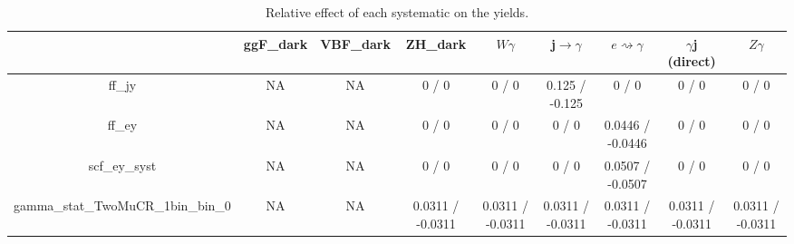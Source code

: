 \documentclass[10pt]{article}
\begin{document}
\begin{table}[htbp]
\begin{center}
\begin{tabular}{|c|c|c|c|c|c|c|c|c|}
\hline 
      & ggF_{dark}      & VBF_{dark}      & ZH_{dark}      & $W\gamma$      & j$\rightarrow\gamma$      & $e\rightsquigarrow\gamma$      & $\gamma$j (direct)      & $Z\gamma$ \\ 
\hline 
  ff_jy &    NA    &    NA    & 0 / 0 & 0 / 0 & 0.125 / -0.125 & 0 / 0 & 0 / 0 & 0 / 0 \\ 
  ff_ey &    NA    &    NA    & 0 / 0 & 0 / 0 & 0 / 0 & 0.0446 / -0.0446 & 0 / 0 & 0 / 0 \\ 
  scf_ey_syst &    NA    &    NA    & 0 / 0 & 0 / 0 & 0 / 0 & 0.0507 / -0.0507 & 0 / 0 & 0 / 0 \\ 
  gamma_stat_TwoMuCR_1bin_bin_0 &    NA    &    NA    & 0.0311 / -0.0311 & 0.0311 / -0.0311 & 0.0311 / -0.0311 & 0.0311 / -0.0311 & 0.0311 / -0.0311 & 0.0311 / -0.0311 \\ 
\hline 
\end{tabular} 
\caption{Relative effect of each systematic on the yields.} 
\end{center} 
\end{table} 
\end{document}
